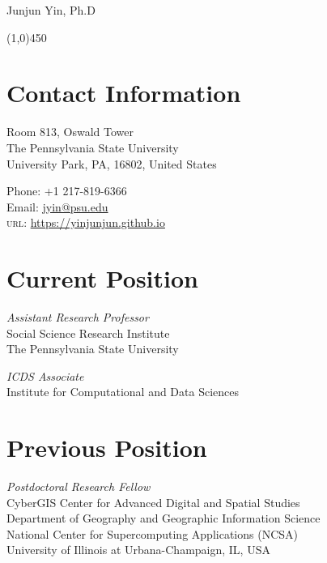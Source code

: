 \documentclass[11pt, a4paper]{article}
\begin{document}
{\LARGE Junjun Yin, Ph.D}
\begin{center}
\line(1,0){450}
\end{center}
\section*{Contact Information}

\begin{multicols}{2}
 \begin{flushleft}
Room 813, Oswald Tower\\
The Pennsylvania State University\\
University Park, PA, 16802, United States
\end{flushleft}
\columnbreak
\begin{flushright}
Phone: +1 217-819-6366\\[.1cm]
Email: \href{mailto:a.jyin@psu.edu}{jyin@psu.edu}\\[.1cm]
\textsc{url}: \href{https://yinjunjun.github.io}{https://yinjunjun.github.io}
\end{flushright}
\end{multicols}


\section*{Current Position}
\begin{multicols}{2}
 \begin{flushleft}
\emph{Assistant Research Professor}\\
Social Science Research Institute\\
The Pennsylvania State University\\
\end{flushleft}
\columnbreak
\begin{flushright}
\emph{ICDS Associate}\\
Institute for Computational and Data Sciences\\
\end{flushright}
\end{multicols}

\section*{Previous Position}
\emph{Postdoctoral Research Fellow}\\
CyberGIS Center for Advanced Digital and Spatial Studies\\
Department of Geography and Geographic Information Science\\
National Center for Supercomputing Applications (NCSA)\\
University of Illinois at Urbana-Champaign, IL, USA
\end{document}
